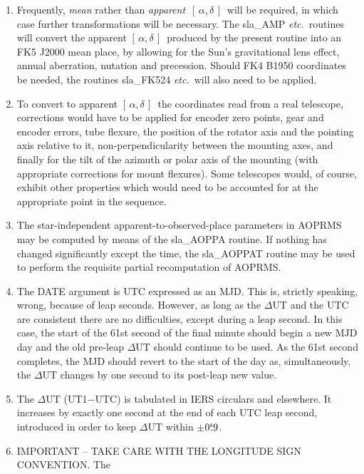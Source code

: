 \documentclass[11pt,twoside]{article}
\newcommand{\radec}     {$[\,\alpha,\delta\,]$}
\newcommand{\tseci}[1]   {$#1$\mbox{$^{\rm s}$}}
\newcommand{\tsec}[2]    {\tseci{#1}$\hspace{-0.3em}.#2$}
\renewcommand{\tsec}[2] {$#1^{\rm s}\hspace{-0.3em}.#2$}
\begin{document}
{\begin{enumerate}
  \item Frequently, {\it mean}\/ rather than {\it apparent}\,
        \radec\ will be required,
        in which case further transformations will be necessary.  The
        sla\_AMP {\it etc.}\ routines will convert
        the apparent \radec\ produced
        by the present routine into an FK5 J2000 mean place, by
        allowing for the Sun's gravitational lens effect, annual
        aberration, nutation and precession.  Should FK4 B1950
        coordinates be needed, the routines sla\_FK524 {\it etc.}\ will also
        need to be applied.
  \item To convert to apparent \radec\ the coordinates read from a
        real telescope, corrections would have to be applied for
        encoder zero points, gear and encoder errors, tube flexure,
        the position of the rotator axis and the pointing axis
        relative to it, non-perpendicularity between the mounting
        axes, and finally for the tilt of the azimuth or polar axis
        of the mounting (with appropriate corrections for mount
        flexures).  Some telescopes would, of course, exhibit other
        properties which would need to be accounted for at the
        appropriate point in the sequence.
  \item The star-independent apparent-to-observed-place parameters
        in AOPRMS may be computed by means of the sla\_AOPPA routine.
        If nothing has changed significantly except the time, the
        sla\_AOPPAT routine may be used to perform the requisite
        partial recomputation of AOPRMS.
  \item The DATE argument is UTC expressed as an MJD.  This is,
        strictly speaking, wrong, because of leap seconds.  However,
        as long as the $\Delta$UT and the UTC are consistent there
        are no difficulties, except during a leap second.  In this
        case, the start of the 61st second of the final minute should
        begin a new MJD day and the old pre-leap $\Delta$UT should
        continue to be used.  As the 61st second completes, the MJD
        should revert to the start of the day as, simultaneously,
        the $\Delta$UT changes by one second to its post-leap new value.
  \item The $\Delta$UT (UT1$-$UTC) is tabulated in IERS circulars and
        elsewhere.  It increases by exactly one second at the end of
        each UTC leap second, introduced in order to keep $\Delta$UT
        within $\pm$\tsec{0}{9}.
  \item IMPORTANT -- TAKE CARE WITH THE LONGITUDE SIGN CONVENTION.  The

\end{enumerate}}
\end{document}

